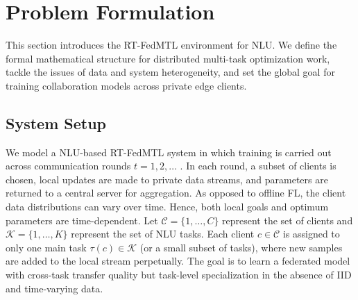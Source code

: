 \section{Problem Formulation}  
\label{sec:problem_definition}  
This section introduces the RT-FedMTL environment for NLU. We define the formal mathematical structure for distributed multi-task optimization work, tackle the issues of data and system heterogeneity, and set the global goal for training collaboration models across private edge clients.

\subsection{System Setup}  
We model a NLU-based RT-FedMTL system in which training is carried out across communication rounds $t=1,2,\dots$ \cite{mcmahan2017communication,smith2017federated,chen2024fedbone}. In each round, a subset of clients is chosen, local updates are made to private data streams, and parameters are returned to a central server for aggregation. As opposed to offline FL, the client data distributions can vary over time. Hence, both local goals and optimum parameters are time-dependent. Let $\mathcal{C}=\{1,\dots,C\}$ represent the set of clients and $\mathcal{K}=\{1,\dots,K\}$ represent the set of NLU tasks. Each client $c\in\mathcal{C}$ is assigned to only one main task $\tau(c)\in\mathcal{K}$ (or a small subset of tasks), where new samples are added to the local stream perpetually. The goal is to learn a federated model with cross-task transfer quality but task-level specialization in the absence of IID and time-varying data.


